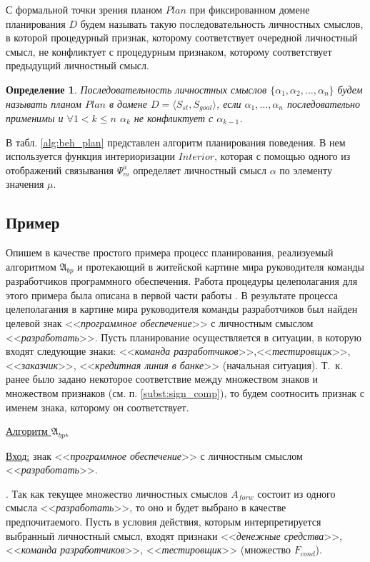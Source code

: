 \documentclass[a4paper, 12pt]{article}
\theoremstyle{break}
\newtheorem{Def}{Определение}
\numberwithin{equation}{section}
\begin{document}
	С формальной точки зрения планом $Plan$ при фиксированном домене планирования $D$ будем называть такую последовательность личностных смыслов, в которой процедурный признак, которому соответствует очередной личностный смысл, не конфликтует с процедурным признаком, которому соответствует предыдущий личностный смысл.
	
	\begin{Def}
		Последовательность личностных смыслов $\{\alpha_1,\alpha_2,\dots,\alpha_n\}$ будем называть планом $Plan$ в домене $D=\langle S_{st},S_{goal} \rangle$, если $\alpha_1,\dots,\alpha_n$ последовательно применимы и $\forall 1<k\leqslant n$ $\alpha_k$ не конфликтует с $\alpha_{k-1}$.
	\end{Def}

	В табл. \ref{alg:beh_plan} представлен алгоритм планирования поведения. В нем используется функция интериоризации $Interior$, которая с помощью одного из отображений связывания $\Psi_m^a$ \cite{PanovA2014a} определяет личностный смысл $\alpha$ по элементу значения $\mu$.
	
	\subsection{Пример} Опишем в качестве простого примера процесс планирования, реализуемый алгоритмом $\mathfrak A_{bp}$ и протекающий в житейской картине мира руководителя команды разработчиков программного обеспечения. Работа процедуры целеполагания для этого примера была описана в первой части работы \cite{PanovA2014a}. В результате процесса целеполагания в картине мира руководителя команды разработчиков был найден целевой знак <<\textit{программное обеспечение}>> с личностным смыслом <<\textit{разработать}>>. Пусть планирование осуществляется в ситуации, в которую входят следующие знаки: <<\textit{команда разработчиков}>>,<<\textit{тестировщик}>>, <<\textit{заказчик}>>, <<\textit{кредитная линия в банке}>> (начальная ситуация). Т.~к. ранее было задано некоторое соответствие между множеством знаков и множеством признаков (см. п. \ref{subst:sign_comp}), то будем соотносить признак с именем знака, которому он соответствует.
	
	\underline{Алгоритм $\mathfrak A_{bp}$.}
	
	\underline{Вход:} знак <<\textit{программное обеспечение}>> с личностным смыслом <<\textit{разработать}>>.

	. Так как текущее множество личностных смыслов $A_{forw}$ состоит из одного смысла <<\textit{разработать}>>, то оно и будет выбрано в качестве предпочитаемого. Пусть в условия действия, которым интерпретируется выбранный личностный смысл, входят признаки <<\textit{денежные средства}>>, <<\textit{команда разработчиков}>>, <<\textit{тестировщик}>> (множество $F_{cond}$).
	
\end{document}
